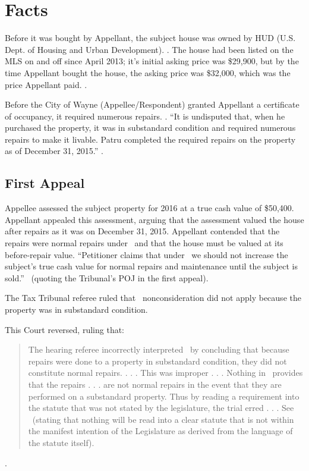 \documentclass[12pt,\documentclassflag]{michiganCourtOfAppealsBrief}
\begin{document}
\section{Facts}
\label{facts}

Before it was bought by Appellant, the subject house was owned by HUD (U.S. Dept. of Housing and Urban Development). \mlsListing[]. 
The house had been listed on the MLS on and off since April 2013;
it's initial asking price was \$29,900,
but by the time Appellant bought the house, the asking price was \$32,000,
which was the price Appellant paid. \mlsHistory[].

Before the City of Wayne (Appellee/Respondent) granted Appellant a certificate of occupancy, it required numerous repairs. \repairs. ``It is undisputed that, when he purchased the property, it was in substandard condition and required numerous repairs to make it livable. Patru completed the required repairs on the property as of December 31, 2015.'' .

\subsection{First Appeal}

Appellee assessed the subject property for 2016 at a true cash value of \$50,400. Appellant appealed this assessment, arguing that the assessment valued the house after repairs as it was on December 31, 2015.
Appellant contended that the repairs were normal repairs under \mathieuGast\ and that the house must be valued at its before-repair value. 
``Petitioner claims that under \mathieuGast\ we should not increase the subject's true cash value for normal repairs and maintenance until the subject is sold.'' \ (quoting the Tribunal's POJ in the first appeal).

The Tax Tribunal referee ruled that \mathieuGast\ nonconsideration did not apply because the property was in substandard condition.

This Court reversed, ruling that:

\begin{quote}
  The hearing referee incorrectly interpreted \mathieuGast\ by concluding that because repairs were done to a property in substandard condition, they did not constitute normal repairs. . . . This was improper . . . Nothing in \mathieuGast\ provides that the repairs . . . are not normal repairs in the event that they are performed on a substandard property. Thus by reading a requirement into the statute that was not stated by the legislature, the trial erred . . . See \ (stating that nothing will be read into a clear statute that is not within the manifest intention of the Legislature as derived from the language of the statute itself).
\end{quote}
.
\end{document}
